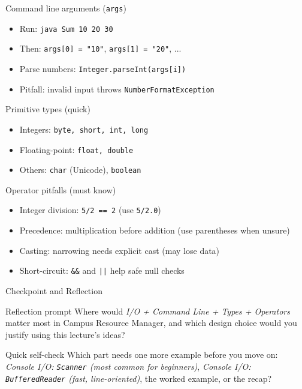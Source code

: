 \documentclass{beamer}
\begin{document}
\begin{frame}{Command line arguments (\texttt{args})}
  \begin{itemize}[<+->]
    \item Run: \texttt{java Sum 10 20 30}
    \item Then: \texttt{args[0] = "10"}, \texttt{args[1] = "20"}, ...
    \item Parse numbers: \texttt{Integer.parseInt(args[i])}
    \item Pitfall: invalid input throws \texttt{NumberFormatException}
  \end{itemize}
  \slidesources{\OOPSUnitISources}
\end{frame}

\begin{frame}{Primitive types (quick)}
  \begin{itemize}[<+->]
    \item Integers: \texttt{byte, short, int, long}
    \item Floating-point: \texttt{float, double}
    \item Others: \texttt{char} (Unicode), \texttt{boolean}
  \end{itemize}
  \slidesources{\OOPSUnitISources}
\end{frame}

\begin{frame}{Operator pitfalls (must know)}
  \begin{itemize}[<+->]
    \item Integer division: \texttt{5/2 == 2} (use \texttt{5/2.0})
    \item Precedence: multiplication before addition (use parentheses when unsure)
    \item Casting: narrowing needs explicit cast (may lose data)
    \item Short-circuit: \texttt{\&\&} and \texttt{||} help safe null checks
  \end{itemize}
  \slidesources{\OOPSUnitISources}
\end{frame}

\begin{frame}{Checkpoint and Reflection}
\begin{block}{Reflection prompt}
Where would \textit{I/O + Command Line + Types + Operators} matter most in Campus Resource Manager, and which design choice would you justify using this lecture's ideas?
\end{block}
\begin{block}{Quick self-check}
Which part needs one more example before you move on: \textit{Console I/O: \texttt{Scanner} (most common for beginners)}, \textit{Console I/O: \texttt{BufferedReader} (fast, line-oriented)}, the worked example, or the recap?
\end{block}
  \slidesources{\OOPSUnitISources}
\end{frame}
\end{document}
